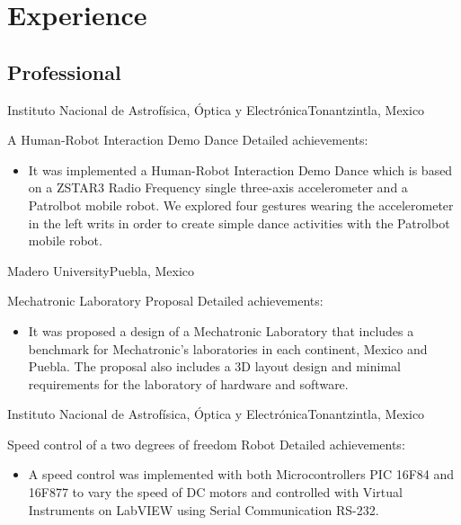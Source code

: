 \documentclass[10pt,a4paper,roman]{moderncv}
\begin{document}
\section{Experience}



\subsection{Professional}

{Instituto Nacional de Astrof\'isica, \'Optica y Electr\'onica}{Tonantzintla, Mexico}{}
{A Human-Robot Interaction Demo Dance 
\newline{}
Detailed achievements:%
\begin{itemize}%
\item It was implemented a Human-Robot Interaction Demo Dance which is based on a 
ZSTAR3 Radio Frequency single three-axis accelerometer and a Patrolbot mobile robot. 
We explored four gestures wearing the accelerometer in the left writs 
in order to create simple dance activities with the Patrolbot mobile robot.
\href{https://sites.google.com/site/perezxochicale/projects/demodance}{\faGlobe}
\end{itemize}
}


{Madero University}{Puebla, Mexico}{}
{Mechatronic Laboratory Proposal
\newline{}
Detailed achievements:%
\begin{itemize}%
\item 
It was proposed a design of a Mechatronic Laboratory that includes a benchmark for
Mechatronic's laboratories in each continent, Mexico and Puebla.
The proposal also includes a 3D layout design 
and minimal requirements for the laboratory of hardware and software.
  \href{https://sites.google.com/site/perezxochicaleprojects/mechatronicslaboratorydesign}{\faGlobe}
\end{itemize}
}


{Instituto Nacional de Astrof\'isica, \'Optica y Electr\'onica}{Tonantzintla, Mexico}{}
{Speed control of a two degrees of freedom Robot
\newline{}
Detailed achievements:%
\begin{itemize}%
\item A speed control was implemented with both Microcontrollers PIC 16F84 and 16F877
to vary the speed of DC motors and 
controlled with Virtual Instruments on LabVIEW using Serial Communication RS-232.
\end{itemize}
}
\end{document}
